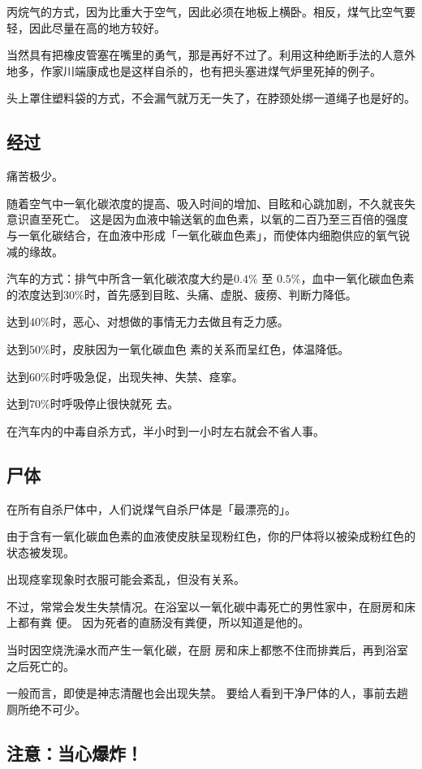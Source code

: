 \documentclass[UTF8]{ctexart}
\begin{document}
丙烷气的方式，因为比重大于空气，因此必须在地板上横卧。相反，煤气比空气要轻，因此尽量在高的地方较好。

当然具有把橡皮管塞在嘴里的勇气，那是再好不过了。利用这种绝断手法的人意外地多，作家川端康成也是这样自杀的，也有把头塞进煤气炉里死掉的例子。

头上罩住塑料袋的方式，不会漏气就万无一失了，在脖颈处绑一道绳子也是好的。

\subsection{经过}

痛苦极少。

随着空气中一氧化碳浓度的提高、吸入时间的增加、目眩和心跳加剧，不久就丧失意识直至死亡。
这是因为血液中输送氧的血色素，以氧的二百乃至三百倍的强度与一氧化碳结合，在血液中形成「一氧化碳血色素」，而使体内细胞供应的氧气锐减的缘故。

汽车的方式：排气中所含一氧化碳浓度大约是$0.4\%$ 至 $0.5\%$，血中一氧化碳血色素的浓度达到$30\%$时，首先感到目眩、头痛、虚脱、疲痨、判断力降低。

达到$40\%$时，恶心、对想做的事情无力去做且有乏力感。

达到$50\%$时，皮肤因为一氧化碳血色 素的关系而呈红色，体温降低。 

达到$60\%$时呼吸急促，出现失神、失禁、痉挛。

达到$70\%$时呼吸停止很快就死 去。 

在汽车内的中毒自杀方式，半小时到一小时左右就会不省人事。

\subsection{尸体}

在所有自杀尸体中，人们说煤气自杀尸体是「最漂亮的」。

由于含有一氧化碳血色素的血液使皮肤呈现粉红色，你的尸体将以被染成粉红色的状态被发现。

出现痉挛现象时衣服可能会紊乱，但没有关系。

不过，常常会发生失禁情况。在浴室以一氧化碳中毒死亡的男性家中，在厨房和床上都有粪 便。
因为死者的直肠没有粪便，所以知道是他的。

当时因空烧洗澡水而产生一氧化碳，在厨 房和床上都憋不住而排粪后，再到浴室之后死亡的。

一般而言，即使是神志清醒也会出现失禁。
要给人看到干净尸体的人，事前去趟厕所绝不可少。

\subsection{注意：当心爆炸！}
\end{document}
